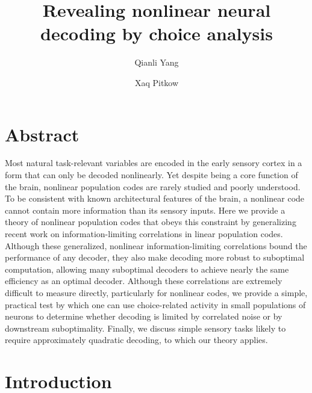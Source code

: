 \documentclass[11pt,twocolumn]{article}
\title{\bf Revealing nonlinear neural decoding by choice analysis}
\author[1]{Qianli Yang}
\author[1,2]{Xaq Pitkow}
\affil[1]{Rice University, Department of Electrical and Computer Engineering}
\affil[2]{Baylor College of Medicine, Department of Neuroscience}
\date{}
\begin{document}
\maketitle
\vspace{-2cm}



%
%
\section*{Abstract}
Most natural task-relevant variables are encoded in the early sensory cortex in a form that can only be decoded nonlinearly. Yet despite being a core function of the brain, nonlinear population codes are rarely studied and poorly understood. To be consistent with known architectural features of the brain, a nonlinear code cannot contain more information than its sensory inputs. Here we provide a theory of nonlinear population codes that obeys this constraint by generalizing recent work on information-limiting correlations \cite{Moreno} in linear population codes. Although these generalized, nonlinear information-limiting correlations bound the performance of any decoder, they also make decoding more robust to suboptimal computation, allowing many suboptimal decoders to achieve nearly the same efficiency as an optimal decoder. Although these correlations are extremely difficult to measure directly, particularly for nonlinear codes, we provide a simple, practical test by which one can use choice-related activity in small populations of neurons to determine whether decoding is limited by correlated noise or by downstream suboptimality. Finally, we discuss simple sensory tasks likely to require approximately quadratic decoding, to which our theory applies.


\section{Introduction}

\end{document}
